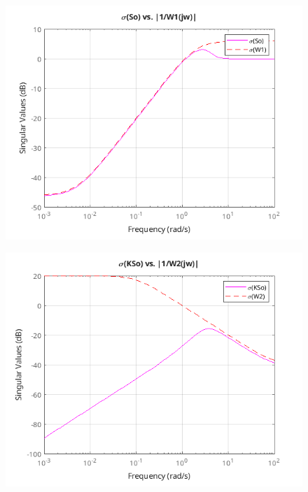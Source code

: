 \documentclass{article}
\begin{document}
\begin{figure}[H]
    \centering
    \includegraphics[width=\textwidth]{uasSigmaSo.png}
\end{figure}

\begin{figure}[H]
    \centering
    \includegraphics[width=\textwidth]{uasSigmaKSo.png}
\end{figure}
\end{document}
